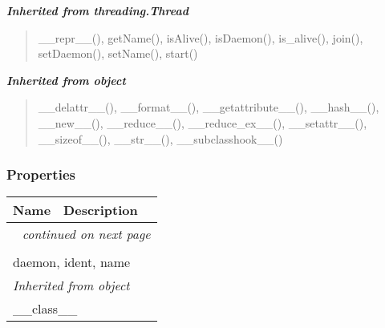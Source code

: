 \large{\textbf{\textit{Inherited from threading.Thread}}}

\begin{quote}
\_\_repr\_\_(), getName(), isAlive(), isDaemon(), is\_alive(), join(), setDaemon(), setName(), start()
\end{quote}

\large{\textbf{\textit{Inherited from object}}}

\begin{quote}
\_\_delattr\_\_(), \_\_format\_\_(), \_\_getattribute\_\_(), \_\_hash\_\_(), \_\_new\_\_(), \_\_reduce\_\_(), \_\_reduce\_ex\_\_(), \_\_setattr\_\_(), \_\_sizeof\_\_(), \_\_str\_\_(), \_\_subclasshook\_\_()
\end{quote}


  \subsubsection{Properties}

    \vspace{-1cm}
\hspace{\varindent}\begin{longtable}{|p{\varnamewidth}|p{\vardescrwidth}|l}
\cline{1-2}
\cline{1-2} \centering \textbf{Name} & \centering \textbf{Description}& \\
\cline{1-2}
\endhead\cline{1-2}\multicolumn{3}{r}{\small\textit{continued on next page}}\\\endfoot\cline{1-2}
\endlastfoot\multicolumn{2}{|l|}{\textit{Inherited from threading.Thread}}\\
\multicolumn{2}{|p{\varwidth}|}{\raggedright daemon, ident, name}\\
\cline{1-2}
\multicolumn{2}{|l|}{\textit{Inherited from object}}\\
\multicolumn{2}{|p{\varwidth}|}{\raggedright \_\_class\_\_}\\
\cline{1-2}
\end{longtable}



